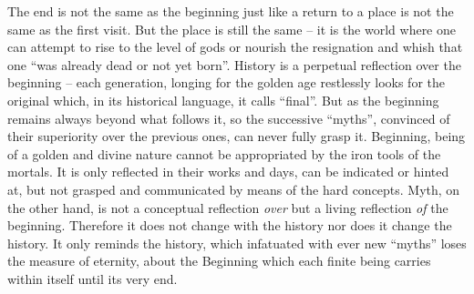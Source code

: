 The end is not the same as the beginning just like a return to a place is not the same as
the first visit. But the place is still the same -- it is the world where one can attempt 
to rise to the level of gods or nourish the resignation and whish that one ``was already 
dead or not yet born''.  History is a perpetual 
reflection over the beginning -- each generation, longing for the golden age 
restlessly looks for the original which, in 
its historical language, it calls ``final''. But as the beginning remains always beyond
what follows it, so the successive ``myths'', convinced of their superiority over the
previous ones, can never fully grasp it. Beginning, being of a
golden and divine nature cannot be appropriated by the iron tools of the 
mortals. It is only reflected in their works and days, can be indicated or
hinted at, but not grasped and communicated by means of the hard  concepts.
Myth, on the other hand, is not a conceptual reflection {\em over} but a 
living reflection {\em of}
 the beginning. Therefore it does not change  with the history nor does it change the
history. It only reminds the history, which infatuated with ever new ``myths''
loses the measure of eternity,
about the Beginning which each finite being carries within itself until its very end.





